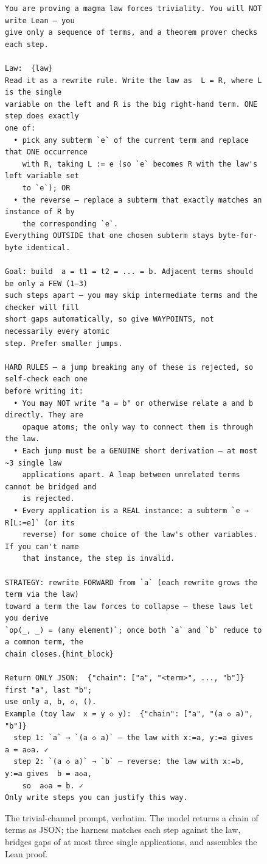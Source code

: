 \documentclass[letterpaper]{article}
\begin{document}
\begin{figure}[t]
\begin{lstlisting}
You are proving a magma law forces triviality. You will NOT write Lean — you
give only a sequence of terms, and a theorem prover checks each step.

Law:  {law}
Read it as a rewrite rule. Write the law as  L = R, where L is the single
variable on the left and R is the big right-hand term. ONE step does exactly
one of:
  • pick any subterm `e` of the current term and replace that ONE occurrence
    with R, taking L := e (so `e` becomes R with the law's left variable set
    to `e`); OR
  • the reverse — replace a subterm that exactly matches an instance of R by
    the corresponding `e`.
Everything OUTSIDE that one chosen subterm stays byte-for-byte identical.

Goal: build  a = t1 = t2 = ... = b. Adjacent terms should be only a FEW (1–3)
such steps apart — you may skip intermediate terms and the checker will fill
short gaps automatically, so give WAYPOINTS, not necessarily every atomic
step. Prefer smaller jumps.

HARD RULES — a jump breaking any of these is rejected, so self-check each one
before writing it:
  • You may NOT write "a = b" or otherwise relate a and b directly. They are
    opaque atoms; the only way to connect them is through the law.
  • Each jump must be a GENUINE short derivation — at most ~3 single law
    applications apart. A leap between unrelated terms cannot be bridged and
    is rejected.
  • Every application is a REAL instance: a subterm `e → R[L:=e]` (or its
    reverse) for some choice of the law's other variables. If you can't name
    that instance, the step is invalid.

STRATEGY: rewrite FORWARD from `a` (each rewrite grows the term via the law)
toward a term the law forces to collapse — these laws let you derive
`op(_, _) = (any element)`; once both `a` and `b` reduce to a common term, the
chain closes.{hint_block}

Return ONLY JSON:  {"chain": ["a", "<term>", ..., "b"]}   first "a", last "b";
use only a, b, ◇, ().
Example (toy law  x = y ◇ y):  {"chain": ["a", "(a ◇ a)", "b"]}
  step 1: `a` → `(a ◇ a)` — the law with x:=a, y:=a gives  a = a◇a. ✓
  step 2: `(a ◇ a)` → `b` — reverse: the law with x:=b, y:=a gives  b = a◇a,
    so  a◇a = b. ✓
Only write steps you can justify this way.
\end{lstlisting}
\caption{The trivial-channel prompt, verbatim. The model returns a chain of
terms as JSON; the harness matches each step against the law, bridges gaps of
at most three single applications, and assembles the Lean proof.}
\label{fig:prompt-trivial}
\end{figure}
\end{document}
